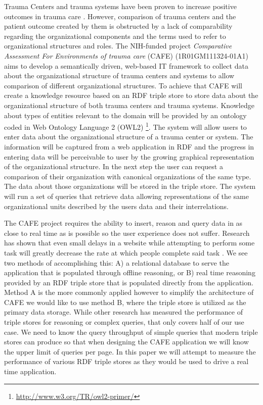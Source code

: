 \documentclass{llncs}
\begin{document}
Trauma Centers and trauma systems have been proven to increase positive outcomes in trauma care \cite{pmid16427544, pmid21206286, pmid26151508}. However, comparison of trauma centers and the patient outcome created by them is obstructed by a lack of comparability regarding the organizational components and the terms used to refer to organizational structures and roles. The NIH-funded project \textit{Comparative Assessment For Environments of trauma care} (CAFE) (1R01GM111324-01A1) aims to develop a semantically driven, web-based IT framework to collect data about the organizational structure of trauma centers and systems to allow comparison of different organizational structures. To achieve that CAFE will create a knowledge resource based on an RDF triple store to store data about the organizational structure of both trauma centers and trauma systems. Knowledge about types of entities relevant to the domain will be provided by an ontology coded in Web Ontology Language 2 (OWL2) \footnote{\url{http://www.w3.org/TR/owl2-primer/}}. The system will allow users to enter data about the organizational structure of a trauma center or system. The information will be captured from a web application in RDF and the progress in entering data will be perceivable to user by the growing graphical representation of the organizational structure. In the next step the user can request a comparison of their organization with canonical organizations of the same type. The data about those organizations will be stored in the triple store. The system will run a set of queries that retrieve data allowing representations of the same organizational units described by the users data and their interrelations.

The CAFE project requires the ability to insert, reason and query data in as close to real time as is possible so the user experience does not suffer. Research has shown that even small delays in a website while attempting to perform some task will greatly decrease the rate at which people complete said task \cite{Galletta2002}.  We see two methods of accomplishing this: A) a relational database to serve the application that is populated through offline reasoning, or B) real time reasoning provided by an RDF triple store that is populated directly from the application. Method A is the more commonly applied however to simplify the architecture of CAFE we would like to use method B, where the triple store is utilized as the primary data storage. While other research has measured the performance of triple stores for reasoning or complex queries, that only covers half of our use case.  We need to know the query throughput of simple queries that modern triple stores can produce so that when designing the CAFE application we will know the upper limit of queries per page. In this paper we will attempt to measure the performance of various RDF triple stores as they would be used to drive a real time application.
\end{document}

